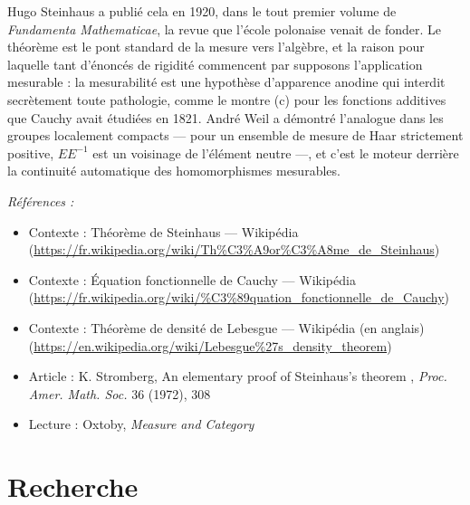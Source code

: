\documentclass[11pt]{article}
\newenvironment{refs}{\par\small\noindent\emph{Références :}\begin{itemize}\setlength\itemsep{0pt}}{\end{itemize}\normalsize}
\begin{document}
\noindent Hugo Steinhaus a publié cela en 1920, dans le tout premier volume de
\textit{Fundamenta Mathematicae}, la revue que l'école polonaise venait de fonder. Le théorème est le
pont standard de la mesure vers l'algèbre, et la raison pour laquelle tant d'énoncés de rigidité
commencent par \og{} supposons l'application mesurable \fg{} : la mesurabilité est une hypothèse d'apparence
anodine qui interdit secrètement toute pathologie, comme le montre (c) pour les fonctions additives
que Cauchy avait étudiées en 1821. André Weil a démontré l'analogue dans les groupes localement
compacts --- pour un ensemble de mesure de Haar strictement positive, $ EE^{-1} $ est un voisinage
de l'élément neutre ---, et c'est le moteur derrière la continuité automatique des homomorphismes
mesurables.

\begin{refs}
\item Contexte : Théorème de Steinhaus --- Wikipédia (\url{https://fr.wikipedia.org/wiki/Th%C3%A9or%C3%A8me_de_Steinhaus})
\item Contexte : Équation fonctionnelle de Cauchy --- Wikipédia (\url{https://fr.wikipedia.org/wiki/%C3%89quation_fonctionnelle_de_Cauchy})
\item Contexte : Théorème de densité de Lebesgue --- Wikipédia (en anglais) (\url{https://en.wikipedia.org/wiki/Lebesgue%27s_density_theorem})
\item Article : K. Stromberg, \og{} An elementary proof of Steinhaus's theorem \fg{}, \textit{Proc. Amer. Math. Soc.} 36 (1972), 308
\item Lecture : Oxtoby, \textit{Measure and Category}
\end{refs}

\bigskip


\section*{Recherche}
\end{document}
